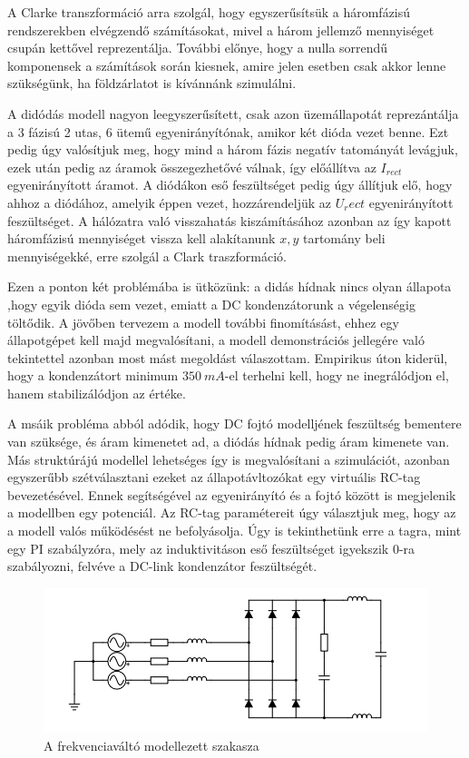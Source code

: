 A Clarke transzformáció arra szolgál, hogy egyszerűsítsük a háromfázisú rendszerekben elvégzendő számításokat, mivel a három jellemző mennyiséget csupán kettővel reprezentálja. További előnye, hogy a nulla sorrendű komponensek a számítások során kiesnek, amire jelen esetben csak akkor lenne szükségünk, ha földzárlatot is kívánnánk szimulálni.

A didódás modell nagyon leegyszerűsített, csak azon üzemállapotát reprezántálja a 3 fázisú 2 utas, 6 ütemű egyenirányítónak, amikor két dióda vezet benne. Ezt pedig úgy valósítjuk meg, hogy mind a három fázis negatív tatományát levágjuk, ezek után pedig az áramok összegezhetővé válnak, így előállítva az $I_{rect}$ egyenirányított áramot. A diódákon eső feszültséget pedig úgy állítjuk elő, hogy ahhoz a diódához, amelyik éppen vezet, hozzárendeljük az $U_rect$ egyenirányított feszültséget. A hálózatra való visszahatás kiszámításához azonban az így kapott háromfázisú mennyiséget vissza kell alakítanunk $x,y$ tartomány beli mennyiségekké, erre szolgál a Clark traszformáció.

Ezen a ponton két problémába is ütközünk: a didás hídnak nincs olyan állapota ,hogy egyik dióda sem vezet, emiatt a DC kondenzátorunk a végelenségig töltődik. A jövőben tervezem a modell további finomításást, ehhez egy állapotgépet kell majd megvalósítani, a modell demonstrációs jellegére való tekintettel azonban most mást megoldást válaszottam. Empirikus úton kiderül, hogy a kondenzátort minimum $350\ mA$-el terhelni kell, hogy ne inegrálódjon el, hanem stabilizálódjon az értéke.

A msáik probléma abból adódik, hogy DC fojtó modelljének feszültség bementere van szüksége, és áram kimenetet ad, a diódás hídnak pedig áram kimenete van. Más struktúrájú modellel lehetséges így is megvalósítani a szimulációt, azonban egyszerűbb szétválasztani ezeket az állapotávltozókat egy virtuális RC-tag bevezetésével. Ennek segítségével az egyenirányító és a fojtó között is megjelenik a modellben egy potenciál. Az RC-tag paramétereit úgy választjuk meg, hogy az a modell valós működésést ne befolyásolja. Úgy is tekinthetünk erre a tagra, mint egy PI szabályzóra, mely az induktivitáson eső feszültséget igyekszik $0$-ra szabályozni, felvéve a DC-link kondenzátor feszültségét.

\begin{figure}[H!]
	\centering
	\includegraphics[width = \textwidth]{figures/VFD_virtual_RC.png}
	\caption{A frekvenciaváltó modellezett szakasza} 
	\label{fig:virtualRC}
\end{figure}

